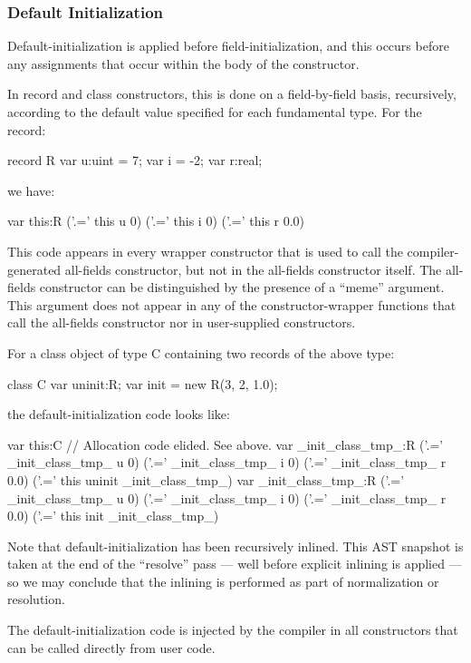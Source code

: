 \subsubsection{Default Initialization}

Default-initialization is applied before field-initialization, and this occurs before any
assignments that occur within the body of the constructor.

In record and class constructors, this is done on a field-by-field basis, recursively,
according to the default value specified for each fundamental type.  For the record:
\begin{chapel}
record R {
  var u:uint = 7;
  var i      = -2;
  var r:real;
}
\end{chapel}
\noindent
we have: 
\begin{numberedchapel}
    var this:R
    ('.=' this u 0)
    ('.=' this i 0)
    ('.=' this r 0.0)
\end{numberedchapel}
\noindent
This code appears in every wrapper constructor that is used to call the compiler-generated
all-fields constructor, but not in the all-fields constructor itself.  The all-fields
constructor can be distinguished by the presence of a ``meme'' argument.  This argument
does not appear in any of the constructor-wrapper functions that call the all-fields
constructor nor in user-supplied constructors.

For a class object of type C containing two records of the above type:
\begin{chapel}
class C {
  var uninit:R;
  var init = new R(3, 2, 1.0);
}
\end{chapel}
\noindent
the default-initialization code looks like:
\begin{numberedchapel}
    var this:C
    // Allocation code elided. See above.
    var _init_class_tmp_:R
    ('.=' _init_class_tmp_ u 0)
    ('.=' _init_class_tmp_ i 0)
    ('.=' _init_class_tmp_ r 0.0)
    ('.=' this uninit _init_class_tmp_)
    var _init_class_tmp_:R
    ('.=' _init_class_tmp_ u 0)
    ('.=' _init_class_tmp_ i 0)
    ('.=' _init_class_tmp_ r 0.0)
    ('.=' this init _init_class_tmp_)
\end{numberedchapel}
\noindent
Note that default-initialization has been recursively inlined.  This AST snapshot
is taken at the end of the ``resolve'' pass --- well before explicit inlining is applied
--- so we may conclude that the inlining is performed as part of normalization or resolution.

The default-initialization code is injected by the compiler in all constructors that can be
called directly from user code.

